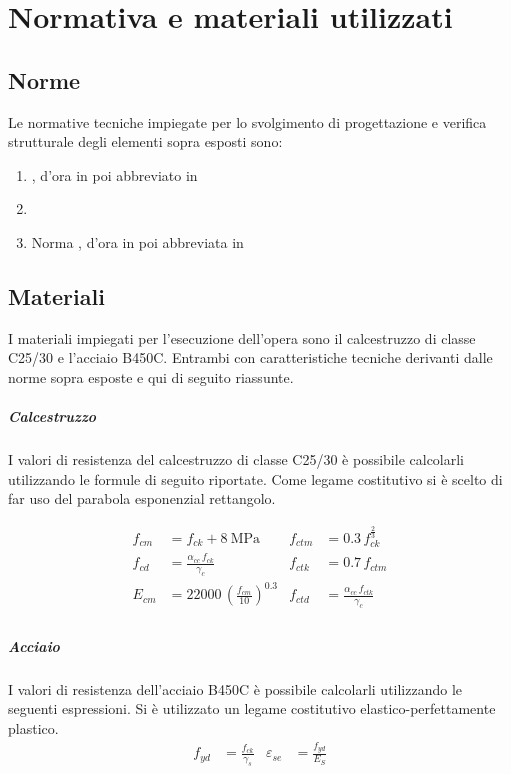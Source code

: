 \chapter{Normativa e materiali utilizzati}\label{chap:materiali}
\section{Norme}
Le normative tecniche impiegate per lo svolgimento di progettazione e verifica strutturale degli elementi sopra esposti sono:
\begin{enumerate}
    \item {}, d'ora in poi abbreviato in 
    \item {}
    \item Norma , d'ora in poi abbreviata in 
\end{enumerate}

\section{Materiali}
I materiali impiegati per l'esecuzione dell'opera sono il calcestruzzo di classe C25/30 e l'acciaio B450C. 
Entrambi con caratteristiche tecniche derivanti dalle norme sopra esposte e qui di seguito riassunte.
\paragraph{Calcestruzzo}
I valori di resistenza del calcestruzzo di classe C25/30 è possibile calcolarli utilizzando le formule di seguito riportate. 
Come legame costitutivo si è scelto di far uso del parabola esponenzial rettangolo.

\begin{align*}
    f_{cm} &= f_{ck} + \SI{8}{\mega\pascal} &f_{ctm} &= 0.3 \, f_{ck}^{\frac{2}{3}} \\
    f_{cd} &= \frac{\alpha_{{cc}} \, f_{ck}}{\gamma_c} &f_{ctk} &= 0.7\, f_{ctm}\\
    E_{cm} &= \num{22000}\,\left(\frac{f_{cm}}{10}\right)^{0.3} &f_{ctd} &= \frac{\alpha_{{cc}} \, f_{ctk}}{\gamma_c}\\ 
\end{align*}

\paragraph{Acciaio}
I valori di resistenza dell'acciaio B450C è possibile calcolarli utilizzando le seguenti espressioni.
Si è utilizzato un legame costitutivo elastico-perfettamente plastico.
\begin{align*}
    f_{yd} &= \frac{f_{ck}}{\gamma_s} & \varepsilon_{se} &= \frac{f_{yd}}{E_S} \\ 
\end{align*}

